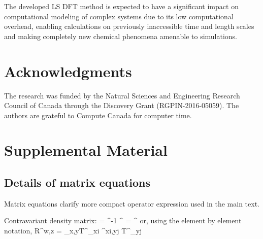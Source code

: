\documentclass[aps,prl,twocolumn,reprint,amsmath,amssymb]{revtex4-1}
\begin{document}
The developed LS DFT method is expected to have a significant impact on computational modeling of complex systems due to its low computational overhead, enabling calculations on previously inaccessible time and length scales and making completely new chemical phenomena amenable to simulations.

\section{Acknowledgments} The research was funded by the Natural Sciences and Engineering Research Council of Canada through the Discovery Grant (RGPIN-2016-05059). The authors are grateful to Compute Canada for computer time.



\section{Supplemental Material}

\setcounter{equation}{0}
\setcounter{figure}{0}

\renewcommand{\theequation}{S\arabic{equation}}
\renewcommand{\thefigure}{S\arabic{figure}}

\subsection{Details of matrix equations}
Matrix equations clarify more compact operator expression used in the main text. 


Contravariant density matrix:
%
\bea
{} =  \sigma^{-1} ^{\dagger}
\sigma = ^{\dagger}  
\eea
%
or, using the element by element notation,
%
\bea
R^{w\mu,z\nu} = \sum_{x,y}{T^{\mu}}_{xi} \sigma^{xi,yj} {T^{\nu}}_{yj}
\eea
\end{document}
